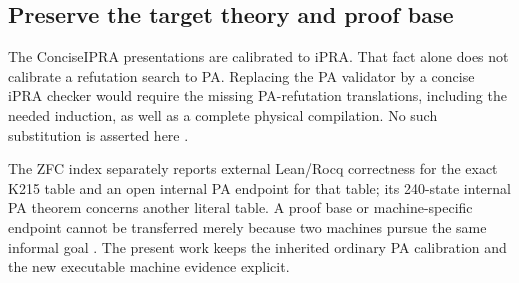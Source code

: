 \subsection{Preserve the target theory and proof base}

The ConciseIPRA presentations are calibrated to iPRA. That fact alone
does not calibrate a refutation search to PA. Replacing the PA validator
by a concise iPRA checker would require the missing PA-refutation
translations, including the needed induction, as well as a complete
physical compilation. No such substitution is asserted here \cite{concise}.

The ZFC index separately reports external Lean/Rocq correctness for the
exact K215 table and an open internal PA endpoint for that table; its
240-state internal PA theorem concerns another literal table. A proof
base or machine-specific endpoint cannot be transferred merely because
two machines pursue the same informal goal \cite{z-root}. The present
work keeps the inherited ordinary PA calibration and the new executable
machine evidence explicit.
